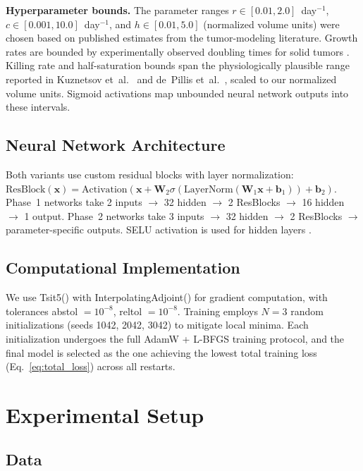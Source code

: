\documentclass{juliacon}
\begin{document}
\textbf{Hyperparameter bounds.} The parameter ranges $r \in [0.01, 2.0]$~day$^{-1}$, $c \in [0.001, 10.0]$~day$^{-1}$, and $h \in [0.01, 5.0]$ (normalized volume units) were chosen based on published estimates from the tumor-modeling literature. Growth rates are bounded by experimentally observed doubling times for solid tumors \cite{vaghi2020gompertz}. Killing rate and half-saturation bounds span the physiologically plausible range reported in Kuznetsov et~al.\ \cite{kuznetsov1994} and de~Pillis et~al.\ \cite{depillis2005validated}, scaled to our normalized volume units. Sigmoid activations map unbounded neural network outputs into these intervals.

\subsection{Neural Network Architecture}

Both variants use custom residual blocks with layer normalization:
$\text{ResBlock}(\mathbf{x}) = \text{Activation}(\mathbf{x} + \mathbf{W}_2 \sigma(\text{LayerNorm}(\mathbf{W}_1 \mathbf{x} + \mathbf{b}_1)) + \mathbf{b}_2)$.
Phase~1 networks take 2 inputs $\rightarrow$ 32 hidden $\rightarrow$ 2 ResBlocks $\rightarrow$ 16 hidden $\rightarrow$ 1 output. Phase~2 networks take 3 inputs $\rightarrow$ 32 hidden $\rightarrow$ 2 ResBlocks $\rightarrow$ parameter-specific outputs. SELU activation is used for hidden layers \cite{teshima2020universal}.

\subsection{Computational Implementation}

We use Tsit5() with InterpolatingAdjoint() for gradient computation, with tolerances abstol $= 10^{-8}$, reltol $= 10^{-8}$. Training employs $N=3$ random initializations (seeds 1042, 2042, 3042) to mitigate local minima. Each initialization undergoes the full AdamW + L-BFGS training protocol, and the final model is selected as the one achieving the lowest total training loss (Eq.~\ref{eq:total_loss}) across all restarts.

\section{Experimental Setup}

\subsection{Data}
\label{sec:data}
\end{document}
